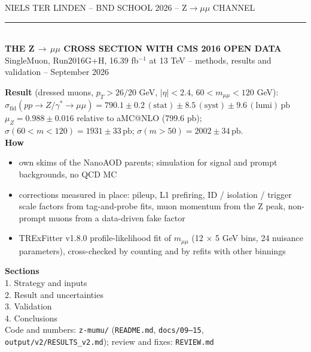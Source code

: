 \documentclass[aspectratio=169,9pt,t]{beamer}
\newcommand{\pb}{\,\mathrm{pb}}
\newcommand{\muZ}{\mu_{Z}}
\newcommand{\sfid}{\sigma_{\mathrm{fid}}}
\begin{document}
\begin{frame}[plain]
  \vspace{0.3cm}
  {\color{muted}\footnotesize\MakeTextUppercase{Niels ter Linden \;--\; BND school 2026 \;--\; Z$\to\mu\mu$ channel}}\\[0.15cm]
  {\color{rule}\rule{\textwidth}{0.5pt}}\\[0.35cm]
  {\color{primary}\bfseries\LARGE\MakeTextUppercase{The Z$\,\to\,\mu\mu$ cross section with CMS 2016 Open Data}}\\[0.25cm]
  {\color{body}\normalsize SingleMuon, Run2016G+H, 16.39 fb$^{-1}$ at 13 TeV \;--\; methods, results and validation \;-- September 2026}\\[0.3cm]
  \begin{minipage}[t]{0.6\textwidth}\footnotesize
    \textbf{Result} (dressed muons, $p_T > 26/20$ GeV, $|\eta| < 2.4$, $60 < m_{\mu\mu} < 120$ GeV):\\[0.1cm]
    {\color{secondary}\large $\sfid(pp\to Z/\gamma^*\to\mu\mu) = 790.1 \pm 0.2\,(\mathrm{stat}) \pm 8.5\,(\mathrm{syst}) \pm 9.6\,(\mathrm{lumi})\pb$}\\[0.15cm]
    $\muZ = 0.988 \pm 0.016$ relative to aMC@NLO (799.6 pb); $\sigma(60<m<120) = 1931 \pm 33\pb$; $\sigma(m>50) = 2002 \pm 34\pb$.\\[0.25cm]
    \textbf{How}
    \begin{itemize}\setlength\itemsep{0.1em}
      \item own skims of the NanoAOD parents; simulation for signal and prompt backgrounds, no QCD MC
      \item corrections measured in place: pileup, L1 prefiring, ID / isolation / trigger scale factors from tag-and-probe fits, muon momentum from the Z peak, non-prompt muons from a data-driven fake factor
      \item TRExFitter v1.8.0 profile-likelihood fit of $m_{\mu\mu}$ (12 $\times$ 5 GeV bins, 24 nuisance parameters), cross-checked by counting and by refits with other binnings
    \end{itemize}
  \end{minipage}\hfill
  \begin{minipage}[t]{0.34\textwidth}\footnotesize\color{muted}
    \textbf{\color{body}Sections}\\[0.1cm]
    1.\; Strategy and inputs\\
    2.\; Result and uncertainties\\
    3.\; Validation\\
    4.\; Conclusions\\[0.3cm]
    {\footnotesize Code and numbers: \texttt{z-mumu/} (\texttt{README.md}, \texttt{docs/09--15}, \texttt{output/v2/RESULTS\_v2.md}); review and fixes: \texttt{REVIEW.md}}
  \end{minipage}
\end{frame}
\end{document}
